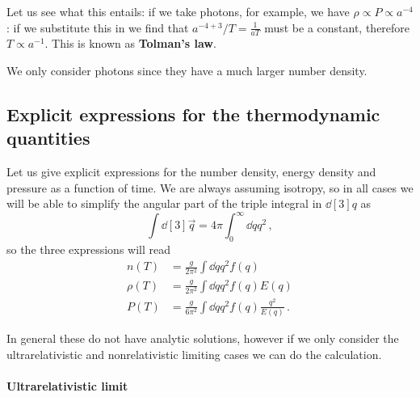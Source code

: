 \documentclass[main.tex]{subfiles}
\begin{document}
Let us see what this entails: if we take photons, for example, we have \(\rho \propto P \propto a^{-4}\): if we substitute this in we find that \(a^{-4 + 3} / T = \frac{1}{aT}\) must be a constant, therefore \(T \propto a^{-1}\).
This is known as \textbf{Tolman's law}.  


We only consider photons since they have a much larger number density.



\subsection{Explicit expressions for the thermodynamic quantities}

Let us give explicit expressions for the number density, energy density and pressure as a function of time. We are always assuming isotropy, so in all cases we will be able to simplify the angular part of the triple integral in \(\dd[3]{q}\) as
%
\begin{equation}
  \int  \dd[3]{\vec{q}} = 4 \pi \int_0^{\infty}  \dd{q} q^2 
\,,
\end{equation}
%
so the three expressions will read 
%
\begin{subequations}
\begin{align}
  n(T) &= \frac{g}{2\pi^2} \int  \dd{q} q^2 f(q) \\ 
  \rho(T) &= \frac{g}{2\pi^2} \int  \dd{q} q^2 f(q) E(q) \\ 
  P(T) &= \frac{g}{6\pi^2} \int  \dd{q} q^2 f(q) \frac{q^2}{E(q)} 
\,.
\end{align}
\end{subequations}

In general these do not have analytic solutions, however if we only consider the ultrarelativistic and nonrelativistic limiting cases we can do the calculation.

\paragraph{Ultrarelativistic limit}
\end{document}
